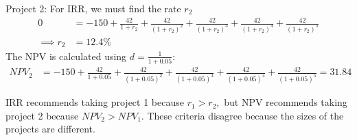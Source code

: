 \documentclass{article}
\begin{document}
\begin{itemize}
\begin{soln}
			Project 2: For IRR, we must find the rate $r_2$ 
			\begin{align*}
				0 &= -150 + \frac{42}{1+r_2} + \frac{42}{(1+r_2)^2} + \frac{42}{(1+r_2)^3} + \frac{42}{(1+r_2)^4} + \frac{42}{(1+r_2)^5} \\
				\implies r_2 &= 12.4\%
			\end{align*}
			The NPV is calculated using $d=\frac{1}{1+0.05}:$
			\begin{align*}
				NPV_2 &= -150 + \frac{42}{1+0.05} + \frac{42}{(1+0.05)^2} + \frac{42}{(1+0.05)^3} + \frac{42}{(1+0.05)^4} + \frac{42}{(1+0.05)^5} = 31.84
			\end{align*}

			IRR recommends taking project 1 because $r_1>r_2,$ but NPV recommends taking project 2 because $NPV_2>NPV_1.$ These criteria disagree because the sizes of the projects are different. 
		\end{soln}

\end{itemize}
\end{document}
